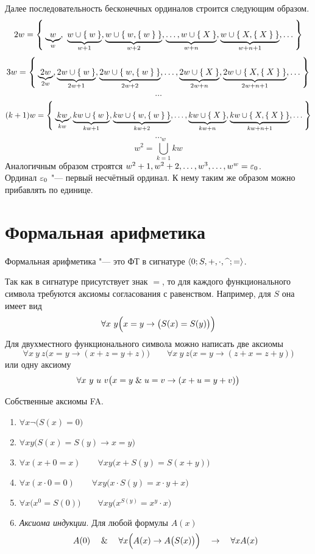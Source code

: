 Далее последовательность бесконечных ординалов строится следующим образом.
$$ 2w = \Set{ \underbrace{w}_w, ~ \underbrace{w \cup \Set{w}}_{w + 1}, \underbrace{w \cup \Set{w, \Set{w}}}_{w + 2}, \underbrace{\dots, w \cup \Set{X}}_{w + n}, \underbrace{w \cup \Set{X, \Set{X}}}_{w + n + 1}, \dots} $$
$$ 3w = \Set{\underbrace{2w}_{2w}, \underbrace{2w \cup \Set{w}}_{2w + 1}, \underbrace{2w \cup \Set{w, \Set{w}}}_{2w + 2}, \dots, \underbrace{2w \cup \Set{X}}_{2w + n}, \underbrace{2w \cup \Set{X, \Set{X}}}_{2w + n + 1}, \dots} $$
$$ \dots $$
$$ (k + 1)w = \Set{\underbrace{kw}_{kw}, \underbrace{kw \cup \Set{w}}_{kw + 1}, \underbrace{kw \cup \Set{w, \Set{w}}}_{kw + 2}, \dots, \underbrace{kw \cup \Set{X}}_{kw + n}, \underbrace{kw \cup \Set{X, \Set{X}}}_{kw + n + 1}, \dots} $$
$$ \dots $$
$$ w^2 = \bigcup_{k = 1}^w kw $$
Аналогичным образом строятся $ w^2 + 1, w^2 + 2, \dots, w^3, \dots, w^w = \varepsilon_0 $. \\
Ординал $ \varepsilon_0 $ "--- первый несчётный ординал. К нему таким же образом можно прибавлять по единице.

\section*{Формальная арифметика}

Формальная арифметика "--- это ФТ в сигнатуре $ \Braket{0; S, +, \cdot, \text\textasciicircum; =} $.

Так как в сигнатуре присутствует знак $ = $, то для каждого функционального символа требуются аксиомы согласования с равенством.
Например, для $ S $ она имеет вид
$$ \forall x~y \Bigl(x = y \to \bigl(S(x) = S(y) \bigr) \Bigr) $$
Для двухместного функционального символа можно написать две аксиомы
$$ \forall x~y~z \bigl( x = y \to (x + z = y + z) \bigr) \qquad \forall x ~ y ~ z \bigl( x = y \to (z + x = z + y) \bigr) $$
или одну аксиому
$$ \forall x ~ y ~ u ~ v \bigl( x = y \mathrel\& u = v \to (x + u = y + v) \bigr) $$

\begin{undefthm}{Собственные аксиомы FA.}
	\hfill
	\begin{enumerate}
		\item $ \forall x \neg \bigl( S(x) = 0 \bigr) $
		\item $ \forall xy \bigl( S(x) = S(y) \to x = y \bigr) $
		\item $ \forall x (x + 0 = x) \qquad \forall xy \bigl( x + S(y) = S(x + y) \bigr) $
		\item $ \forall x (x \cdot 0 = 0) \qquad \forall xy \bigl( x \cdot S(y) = x \cdot y + x \bigr) $
		\item $ \forall x \bigl(x^0 = S(0) \bigr) \qquad \forall xy \bigl( x^{S(y)} = x^y \cdot x \bigr) $
		\item \emph{Аксиома индукции}. Для любой формулы $ A(x) $
			$$ A(0) \quad \mathrel\& \quad \forall x \Bigl(A(x) \to A \bigl( S(x) \bigr) \Bigr) \quad \to \quad \forall x A(x) $$
	\end{enumerate}
\end{undefthm}

